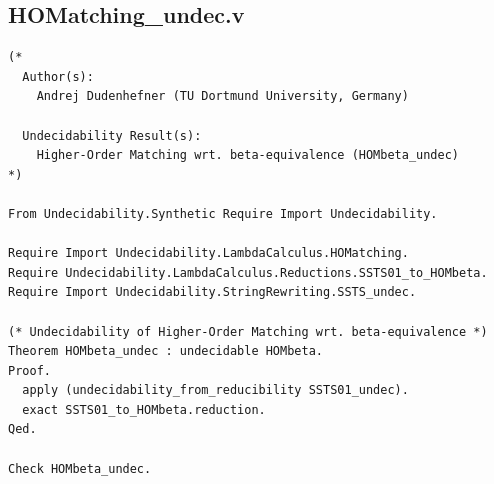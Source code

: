 \documentclass[10pt,a4paper]{amsart}
\begin{document}
\subsection*{HOMatching\_undec.v}
\begin{lstlisting}
(*
  Author(s):
    Andrej Dudenhefner (TU Dortmund University, Germany)

  Undecidability Result(s):
    Higher-Order Matching wrt. beta-equivalence (HOMbeta_undec)
*)

From Undecidability.Synthetic Require Import Undecidability.

Require Import Undecidability.LambdaCalculus.HOMatching.
Require Undecidability.LambdaCalculus.Reductions.SSTS01_to_HOMbeta.
Require Import Undecidability.StringRewriting.SSTS_undec.

(* Undecidability of Higher-Order Matching wrt. beta-equivalence *)
Theorem HOMbeta_undec : undecidable HOMbeta.
Proof.
  apply (undecidability_from_reducibility SSTS01_undec).
  exact SSTS01_to_HOMbeta.reduction.
Qed.

Check HOMbeta_undec.

\end{lstlisting}
\end{document}
